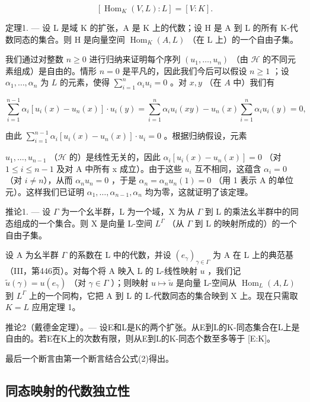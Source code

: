 \[
[ \operatorname{Hom} _ {K} (V, L): L ] = [ V: K ].\tag{2}
\]

定理1. --- 设 L 是域 K 的扩张，A 是 K 上的代数；设 H 是 A 到 L 的所有 K-代数同态的集合。则 H 是向量空间 \(\operatorname{Hom}_{K}(A, L)\) （在 L 上）的一个自由子集。

我们通过对整数 \(n \geqslant 0\) 进行归纳来证明每个序列 \((u_1, \ldots, u_n)\) （由 \(\mathcal{H}\) 的不同元素组成）是自由的。情形 \(n = 0\) 是平凡的，因此我们今后可以假设 \(n \geqslant 1\) ；设 \(\alpha_1, \ldots, \alpha_n\) 为 \(L\) 的元素，使得 \(\sum_{i=1}^{n} \alpha_i u_i = 0\) 。对 \(x, y\) （在 \(A\) 中）我们有

\[
\sum_ {i = 1} ^ {n - 1} \alpha_ {i} [ u _ {i} (x) - u _ {n} (x) ] \cdot u _ {i} (y) = \sum_ {i = 1} ^ {n} \alpha_ {i} u _ {i} (x y) - u _ {n} (x) \sum_ {i = 1} ^ {n} \alpha_ {i} u _ {i} (y) = 0,
\]

由此 \(\sum_{i=1}^{n-1} \alpha_i [u_i(x) - u_n(x)] \cdot u_i = 0\) 。根据归纳假设，元素

\(u_{1}, \ldots, u_{n-1}\) （\(\mathscr{H}\) 的）是线性无关的，因此 \(\alpha_{i}[u_{i}(x) - u_{n}(x)] = 0\) （对 \(1 \leqslant i \leqslant n-1\) 及对 A 中所有 x 成立）。由于这些 \(u_{i}\) 互不相同，这蕴含 \(\alpha_{i} = 0\) （对 \(i \neq n\)），从而 \(\alpha_{n}u_{n} = 0\) ，于是 \(\alpha_{n} = \alpha_{n}u_{n}(1) = 0\) （用 1 表示 A 的单位元）。这样我们已证明 \(\alpha_{1}, \ldots, \alpha_{n-1}, \alpha_{n}\) 均为零，这就证明了该定理。

推论1. — 设 \(\Gamma\) 为一个幺半群，L 为一个域，X 为从 \(\Gamma\) 到 L 的乘法幺半群中的同态组成的一个集合。则 X 是向量 L-空间 \(L^{\Gamma}\) （从 \(\Gamma\) 到 L 的映射所成的）的一个自由子集。

设 A 为幺半群 \(\Gamma\) 的系数在 L 中的代数，并设 \((e_{\gamma})_{\gamma \in \Gamma}\) 为 A 在 L 上的典范基（III，第446页）。对每个将 A 映入 L 的 L-线性映射 \(u\) ，我们记 \(\tilde{u}(\gamma) = u(e_{\gamma})\) （对 \(\gamma \in \Gamma\) ）；则映射 \(u \mapsto \tilde{u}\) 是向量 L-空间从 \(\operatorname{Hom}_{L}(A, L)\) 到 \(L^{\Gamma}\) 上的一个同构，它把 A 到 L 的 L-代数同态的集合映到 X 上。现在只需取 \(K = L\) 应用定理 1。

推论2（戴德金定理）。--- 设E和L是K的两个扩张。从E到L的K-同态集合在L上是自由的。若E在K上的次数有限，则从E到L的K-同态个数至多等于 {[}E:K{]}。

最后一个断言由第一个断言结合公式(2)得出。

\subsection{同态映射的代数独立性}

